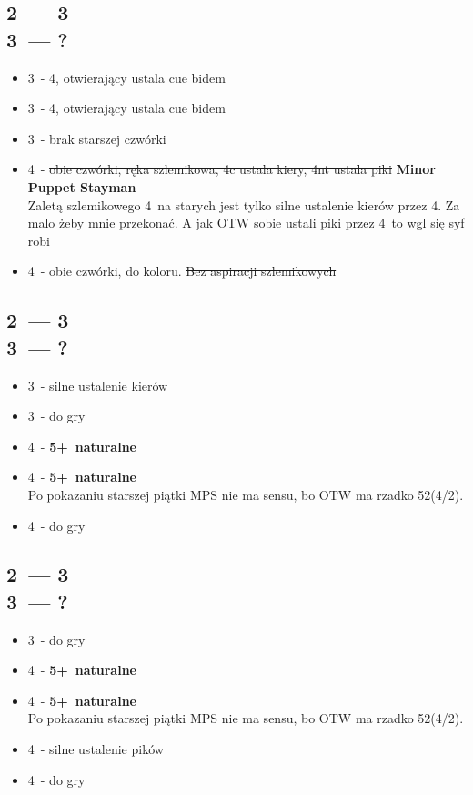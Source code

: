 \documentclass[12pt, a4paper]{article}
\begin{document}
    \subsection{2\ntx\ --- 3\clubs \\ 3\diams\ --- ?}
    \begin{itemize}
        \item 3\hearts\ - 4\spades, otwierający ustala cue bidem
        \item 3\spades\ - 4\hearts, otwierający ustala cue bidem
        \item 3\nt\ - brak starszej czwórki \br
        \item 4\clubs\ - \st{obie czwórki, ręka szlemikowa, 4c ustala kiery, 4nt ustala piki}
        \textbf{Minor Puppet Stayman} \\
        Zaletą szlemikowego 4\clubs\ na starych jest tylko silne ustalenie kierów przez 4\diams.
        Za malo żeby mnie przekonać. A jak OTW sobie ustali piki przez 4\nt\ to wgl się syf robi
        \item 4\diams\ - obie czwórki, do koloru. \st{Bez aspiracji szlemikowych}
    \end{itemize}

    \subsection{2\ntx\ --- 3\clubs \\ 3\hearts\ --- ?}
    \begin{itemize}
        \item 3\spades\ - silne ustalenie kierów
        \item 3\nt\ - do gry
        \item 4\clubs\ - \textbf{5+\clubs\ naturalne}
        \item 4\diams\ - \textbf{5+\diams\ naturalne}\\
        Po pokazaniu starszej piątki MPS nie ma sensu, bo OTW ma rzadko 52(4/2).
        \item 4\hearts\ - do gry
    \end{itemize}

    \pagebreak
    \subsection{2\ntx\ --- 3\clubs \\ 3\spades\ --- ?}
    \begin{itemize}
        \item 3\nt\ - do gry
        \item 4\clubs\ - \textbf{5+\clubs\ naturalne}
        \item 4\diams\ - \textbf{5+\diams\ naturalne}\\
        Po pokazaniu starszej piątki MPS nie ma sensu, bo OTW ma rzadko 52(4/2).
        \item 4\hearts\ - silne ustalenie pików
        \item 4\spades\ - do gry
    \end{itemize}
\end{document}

